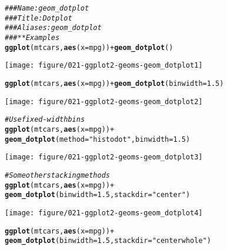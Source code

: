 \documentclass[a4paper,titlepage]{tufte-handout}\usepackage[]{graphicx}\usepackage[]{color}
\makeatletter
\def\maxwidth{ %
  \ifdim\Gin@nat@width>\linewidth
    \linewidth
  \else
    \Gin@nat@width
  \fi
}
\newcommand{\hlnum}[1]{\textcolor[rgb]{0.686,0.059,0.569}{#1}}%
\newcommand{\hlstr}[1]{\textcolor[rgb]{0.192,0.494,0.8}{#1}}%
\newcommand{\hlcom}[1]{\textcolor[rgb]{0.678,0.584,0.686}{\textit{#1}}}%
\newcommand{\hlopt}[1]{\textcolor[rgb]{0,0,0}{#1}}%
\newcommand{\hlstd}[1]{\textcolor[rgb]{0.345,0.345,0.345}{#1}}%
\newcommand{\hlkwc}[1]{\textcolor[rgb]{0.333,0.667,0.333}{#1}}%
\newcommand{\hlkwd}[1]{\textcolor[rgb]{0.737,0.353,0.396}{\textbf{#1}}}%
\newenvironment{kframe}{%
 \def\at@end@of@kframe{}%
 \ifinner\ifhmode%
  \def\at@end@of@kframe{\end{minipage}}%
  \begin{minipage}{\columnwidth}%
 \fi\fi%
 \def\FrameCommand##1{\hskip\@totalleftmargin \hskip-\fboxsep
 \colorbox{shadecolor}{##1}\hskip-\fboxsep
     \hskip-\linewidth \hskip-\@totalleftmargin \hskip\columnwidth}%
 \MakeFramed {\advance\hsize-\width
   \@totalleftmargin\z@ \linewidth\hsize
   \@setminipage}}%
 {\par\unskip\endMakeFramed%
 \at@end@of@kframe}
\newenvironment{knitrout}{}{} %
\makeatother
\begin{document}
\begin{knitrout}
\color{fgcolor}\begin{kframe}
\begin{alltt}
\hlcom{### Name: geom_dotplot}
\hlcom{### Title: Dot plot}
\hlcom{### Aliases: geom_dotplot}
\hlcom{### ** Examples}
\hlkwd{ggplot}\hlstd{(mtcars,} \hlkwd{aes}\hlstd{(}\hlkwc{x} \hlstd{= mpg))} \hlopt{+} \hlkwd{geom_dotplot}\hlstd{()}
\end{alltt}


{\ttfamily\noindent\itshape\color{messagecolor}{\#\# stat\_bindot: binwidth defaulted to range/30. Use 'binwidth = x' to adjust this.}}\end{kframe}
\texttt{[image: figure/021-ggplot2-geoms-geom\_dotplot1]} 
\begin{kframe}\begin{alltt}
\hlkwd{ggplot}\hlstd{(mtcars,} \hlkwd{aes}\hlstd{(}\hlkwc{x} \hlstd{= mpg))} \hlopt{+} \hlkwd{geom_dotplot}\hlstd{(}\hlkwc{binwidth} \hlstd{=} \hlnum{1.5}\hlstd{)}
\end{alltt}
\end{kframe}
\texttt{[image: figure/021-ggplot2-geoms-geom\_dotplot2]} 
\begin{kframe}\begin{alltt}
\hlcom{# Use fixed-width bins}
\hlkwd{ggplot}\hlstd{(mtcars,} \hlkwd{aes}\hlstd{(}\hlkwc{x} \hlstd{= mpg))} \hlopt{+}
  \hlkwd{geom_dotplot}\hlstd{(}\hlkwc{method}\hlstd{=}\hlstr{"histodot"}\hlstd{,} \hlkwc{binwidth} \hlstd{=} \hlnum{1.5}\hlstd{)}
\end{alltt}
\end{kframe}
\texttt{[image: figure/021-ggplot2-geoms-geom\_dotplot3]} 
\begin{kframe}\begin{alltt}
\hlcom{# Some other stacking methods}
\hlkwd{ggplot}\hlstd{(mtcars,} \hlkwd{aes}\hlstd{(}\hlkwc{x} \hlstd{= mpg))} \hlopt{+}
  \hlkwd{geom_dotplot}\hlstd{(}\hlkwc{binwidth} \hlstd{=} \hlnum{1.5}\hlstd{,} \hlkwc{stackdir} \hlstd{=} \hlstr{"center"}\hlstd{)}
\end{alltt}
\end{kframe}
\texttt{[image: figure/021-ggplot2-geoms-geom\_dotplot4]} 
\begin{kframe}\begin{alltt}
\hlkwd{ggplot}\hlstd{(mtcars,} \hlkwd{aes}\hlstd{(}\hlkwc{x} \hlstd{= mpg))} \hlopt{+}
  \hlkwd{geom_dotplot}\hlstd{(}\hlkwc{binwidth} \hlstd{=} \hlnum{1.5}\hlstd{,} \hlkwc{stackdir} \hlstd{=} \hlstr{"centerwhole"}\hlstd{)}

\end{alltt}
\end{kframe}
\end{knitrout}
\end{document}
